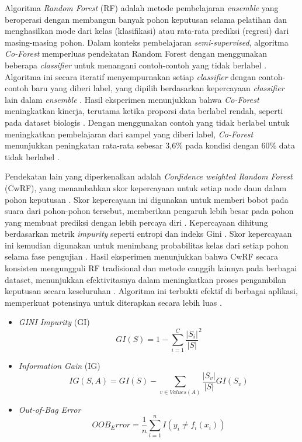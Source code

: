 \documentclass[conference]{IEEEtran}
\begin{document}
Algoritma \textit{Random Forest} (RF) adalah metode pembelajaran \textit{ensemble} yang beroperasi dengan membangun banyak pohon keputusan selama pelatihan dan menghasilkan mode dari kelas (klasifikasi) 
atau rata-rata prediksi (regresi) dari masing-masing pohon. Dalam konteks pembelajaran \textit{semi-supervised}, algoritma \textit{Co-Forest} memperluas pendekatan Random Forest dengan menggunakan 
beberapa \textit{classifier} untuk menangani contoh-contoh yang tidak berlabel \cite{b23}. Algoritma ini secara iteratif menyempurnakan setiap \textit{classifier} dengan contoh-contoh baru yang diberi label, 
yang dipilih berdasarkan kepercayaan \textit{classifier} lain dalam \textit{ensemble} \cite{b23}. Hasil eksperimen menunjukkan bahwa \textit{Co-Forest} meningkatkan kinerja, terutama ketika proporsi data berlabel rendah, 
seperti pada dataset biologis \cite{b23}. Dengan menggunakan contoh yang tidak berlabel untuk meningkatkan pembelajaran dari sampel yang diberi label, \textit{Co-Forest} menunjukkan peningkatan 
rata-rata sebesar 3,6\% pada kondisi dengan 60\% data tidak berlabel \cite{b23}.

Pendekatan lain yang diperkenalkan adalah \textit{Confidence weighted Random Forest} (CwRF), yang menambahkan skor kepercayaan untuk setiap node daun dalam pohon keputusan \cite{b24}. Skor kepercayaan ini digunakan 
untuk memberi bobot pada suara dari pohon-pohon tersebut, memberikan pengaruh lebih besar pada pohon yang membuat prediksi dengan lebih percaya diri \cite{b24}. Kepercayaan dihitung berdasarkan metrik \textit{impurity} 
seperti entropi dan indeks Gini \cite{b24}. Skor kepercayaan ini kemudian digunakan untuk menimbang probabilitas kelas dari setiap pohon selama fase pengujian \cite{b24}. Hasil eksperimen menunjukkan bahwa CwRF secara konsisten 
mengungguli RF tradisional dan metode canggih lainnya pada berbagai dataset, menunjukkan efektivitasnya dalam meningkatkan proses pengambilan keputusan secara keseluruhan \cite{b24}. Algoritma ini terbukti efektif 
di berbagai aplikasi, memperkuat potensinya untuk diterapkan secara lebih luas \cite{b24}.

\begin{itemize}
    \item \textit{GINI Impurity} (GI)
        \begin{equation}
            GI(S) = 1 - \sum_{i=1}^C \frac{|S_i|} {|S|}^2
        \end{equation}
    \item \textit{Information Gain} (IG)
        \begin{equation}
            IG(S, A) = GI(S) - \sum_{v \in Values(A)} \frac{|S_v|} {|S|} GI(S_v)
        \end{equation}
    \item \textit{Out-of-Bag Error}
        \begin{equation}
            OOB_Error = \frac{1}{n} \sum_{i=1}^n I(y_i \neq f_i(x_i))
        \end{equation}
\end{itemize}
\end{document}
